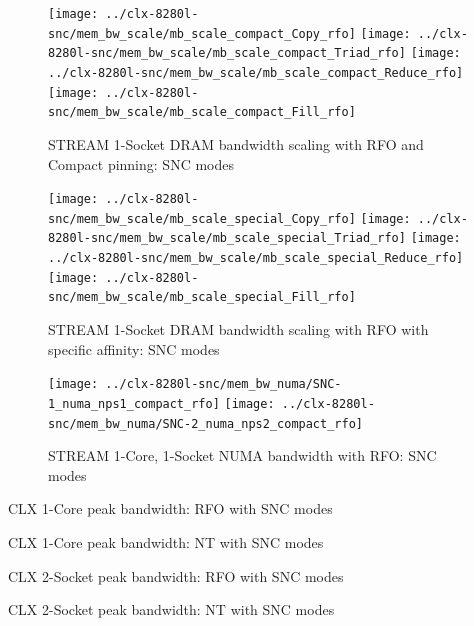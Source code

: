 \documentclass{article}
\begin{document}
\begin{figure}[!hb]
    \centering
    \texttt{[image: ../clx-8280l-snc/mem\_bw\_scale/mb\_scale\_compact\_Copy\_rfo]}
    \texttt{[image: ../clx-8280l-snc/mem\_bw\_scale/mb\_scale\_compact\_Triad\_rfo]}
    \texttt{[image: ../clx-8280l-snc/mem\_bw\_scale/mb\_scale\_compact\_Reduce\_rfo]}
    \texttt{[image: ../clx-8280l-snc/mem\_bw\_scale/mb\_scale\_compact\_Fill\_rfo]}
    \caption{STREAM 1-Socket DRAM bandwidth scaling with RFO and Compact pinning: SNC modes}
    \label{figure:mem_bw_scale_compact_rfo_clx_snc}
\end{figure}

\begin{figure}[!hb]
    \centering
    \texttt{[image: ../clx-8280l-snc/mem\_bw\_scale/mb\_scale\_special\_Copy\_rfo]}
    \texttt{[image: ../clx-8280l-snc/mem\_bw\_scale/mb\_scale\_special\_Triad\_rfo]}
    \texttt{[image: ../clx-8280l-snc/mem\_bw\_scale/mb\_scale\_special\_Reduce\_rfo]}
    \texttt{[image: ../clx-8280l-snc/mem\_bw\_scale/mb\_scale\_special\_Fill\_rfo]}
    \caption{STREAM 1-Socket DRAM bandwidth scaling with RFO with specific affinity: SNC modes}
    \label{figure:mem_bw_scale_special_rfo_clx_snc}
\end{figure}

\begin{figure}[!hb]
    \centering
    \texttt{[image: ../clx-8280l-snc/mem\_bw\_numa/SNC-1\_numa\_nps1\_compact\_rfo]}
    \texttt{[image: ../clx-8280l-snc/mem\_bw\_numa/SNC-2\_numa\_nps2\_compact\_rfo]}
    \caption{STREAM 1-Core, 1-Socket NUMA bandwidth with RFO: SNC modes}
    \label{figure:mem_bw_numa_rfo_clx_snc}
\end{figure}

\begin{table}[!hb]
\centering

\caption{CLX 1-Core peak bandwidth: RFO with SNC modes}
\label{table:mem_bw_core_rfo_clx_snc}
\end{table}
\begin{table}[!hb]
\centering

\caption{CLX 1-Core peak bandwidth: NT with SNC modes}
\label{table:mem_bw_core_nt_clx_snc}
\end{table}
\begin{table}[!hb]
\centering

\caption{CLX 2-Socket peak bandwidth: RFO with SNC modes}
\label{table:mem_bw_node_rfo_clx_snc}
\end{table}
\begin{table}[!hb]
\centering

\caption{CLX 2-Socket peak bandwidth: NT with SNC modes}
\label{table:mem_bw_node_nt_clx_snc}
\end{table}
\end{document}
